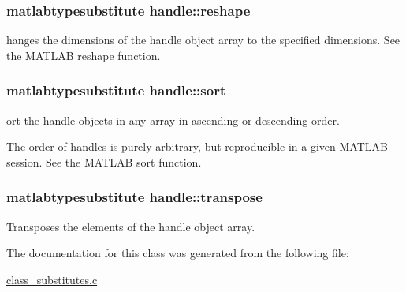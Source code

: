 \hypertarget{classhandle_acef58ae5e52255411835a4fcaf2edd49}{
\subsubsection[{reshape}]{\setlength{\rightskip}{0pt plus 5cm}matlabtypesubstitute {\bf handle\-::reshape}}}\label{classhandle_acef58ae5e52255411835a4fcaf2edd49}


hanges the dimensions of the handle object array to the specified dimensions. See the M\-A\-T\-L\-A\-B reshape function. 

\hypertarget{classhandle_ad11b0be4c173a9d31122c1298eb96a97}{
\subsubsection[{sort}]{\setlength{\rightskip}{0pt plus 5cm}matlabtypesubstitute {\bf handle\-::sort}}}\label{classhandle_ad11b0be4c173a9d31122c1298eb96a97}


ort the handle objects in any array in ascending or descending order. 

The order of handles is purely arbitrary, but reproducible in a given M\-A\-T\-L\-A\-B session. See the M\-A\-T\-L\-A\-B sort function. \hypertarget{classhandle_acd9b55f206750374c4dfca508cfff084}{
\subsubsection[{transpose}]{\setlength{\rightskip}{0pt plus 5cm}matlabtypesubstitute {\bf handle\-::transpose}}}\label{classhandle_acd9b55f206750374c4dfca508cfff084}


Transposes the elements of the handle object array. 



The documentation for this class was generated from the following file\-:\begin{DoxyCompactItemize}
\item 
\hyperlink{class__substitutes_8c}{class\-\_\-substitutes.\-c}\end{DoxyCompactItemize}
